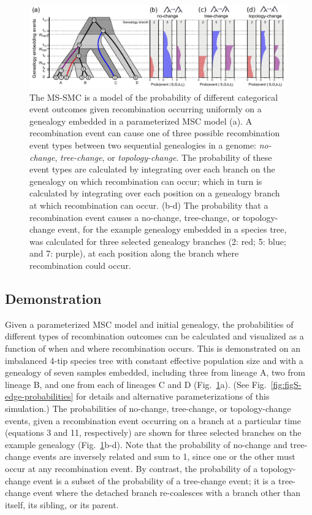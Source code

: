 \documentclass[11pt]{article}
\begin{document}
\begin{figure}
	\centering
	\includegraphics[width=0.99\textwidth]{figures/current/Fig4-embedding-with-probabilities.pdf}
	\caption{
		The MS-SMC is a model of the probability of different categorical event
		outcomes given recombination occurring uniformly on a genealogy embedded
		in a parameterized MSC model (a). 
		A recombination event can cause one of three possible recombination 
		event types between two sequential genealogies in a genome: 
		\emph{no-change}, \emph{tree-change}, or \emph{topology-change}.
		The probability of these event types are calculated by integrating over
		each branch on the genealogy on which recombination can occur; which
		in turn is calculated by integrating over each position on a genealogy
		branch at which recombination can occur.
		(b-d) The probability that a recombination event causes a no-change, tree-change, or topology-change event, for the example genealogy 
		embedded in a species tree, was calculated for three selected 
		genealogy branches (2: red; 5: blue; and 7: purple), at each position
		along the branch where recombination could occur.
	}
	\label{fig:edge-probabilities}
\end{figure}


\subsection{Demonstration}
Given a parameterized MSC model and initial genealogy, the probabilities of 
different types of recombination outcomes can be calculated and visualized as 
a function of when and where recombination occurs. This is demonstrated on an 
imbalanced 4-tip species tree with constant effective population size 
and with a genealogy of seven samples embedded, 
including three from lineage A, two from lineage B, and one from each of lineages
C and D (Fig.~\ref{fig:edge-probabilities}a). 
(See Fig.~\ref{fig:figS-edge-probabilities} for details and
alternative parameterizations of this simulation.)
The probabilities of no-change, tree-change, or topology-change events, 
given a recombination event occurring on a branch at a particular time 
(equations 3 and 11, respectively) are shown for three selected branches
on the example genealogy (Fig.~\ref{fig:edge-probabilities}b-d). 
Note that the probability of no-change and tree-change events 
are inversely related and sum to 1, since one or the other must occur at any 
recombination event. By contrast, the probability of a 
topology-change event is a subset of the probability of a tree-change 
event;
it is a tree-change event where the detached branch re-coalesces with 
a branch other than itself, its sibling, or its parent.
\end{document}
